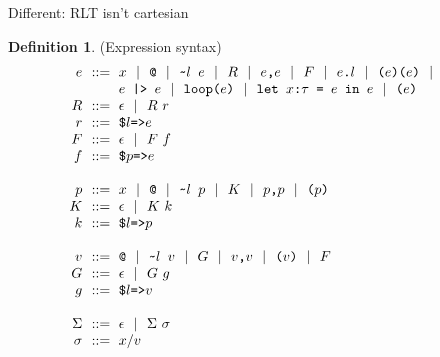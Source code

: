 \documentclass[acmsmall]{acmart}
\theoremstyle{definition}
\newtheorem{definition}{Definition}[section]
\begin{document}
Different: RLT isn't cartesian



\begin{definition}(Expression syntax)
  \label{definition:expression_syntax}
  \[\begin{array}[t]{r@{}l}
    \nonterm{e} 
    & 
    \is 
    \begin{array}[t]{@{}l}
      \code{$x$} \sep 
      \code{@} \sep
      \code{\ttilde$l$ $e$} \sep 
      R \sep
      \code{$e$,$e$} \sep
      F \sep 
      \code{$e$.$l$} \sep
      \code{($e$)($e$)} \sep
      \\
      \code{$e$ |> $e$} \sep
      \code{loop($e$)} \sep
      \code{let $x$:$\tau$ = $e$ in $e$} \sep
      \code{($e$)}
    \end{array}
    \\
    \nonterm{R} & \is \epsilon \sep R\ r
    \\
    \nonterm{r} & \is \code{\$$l$=>$e$}
    \\
    \nonterm{F} & \is \epsilon \sep F\ f
    \\
    \nonterm{f} & \is \code{\$$p$=>$e$}
    \\
    \\
    \nonterm{p} & \is 
      \code{$x$} \sep
      \code{@} \sep
      \code{\ttilde$l$ $p$} \sep
      K \sep
      \code{$p$,$p$} \sep
      \code{($p$)} 
    \\
    \nonterm{K} & \is \epsilon \sep K\ k
    \\
    \nonterm{k} & \is \code{\$$l$=>$p$}
    \\
    \\
    \nonterm{v} & \is 
      \code{@} \sep
      \code{\ttilde$l$ $v$} \sep
      G \sep
      \code{$v$,$v$} \sep
      \code{($v$)} \sep
      F 
    \\
    \nonterm{G} & \is \epsilon \sep G\ g
    \\
    \nonterm{g} & \is \code{\$$l$=>$v$}
    \\
    \\
    \nonterm{\Sigma} & \is \epsilon \sep \Sigma\ \sigma
    \\
    \nonterm{\sigma} & \is x \slash v
  \end{array}\]
\end{definition}
\end{document}
